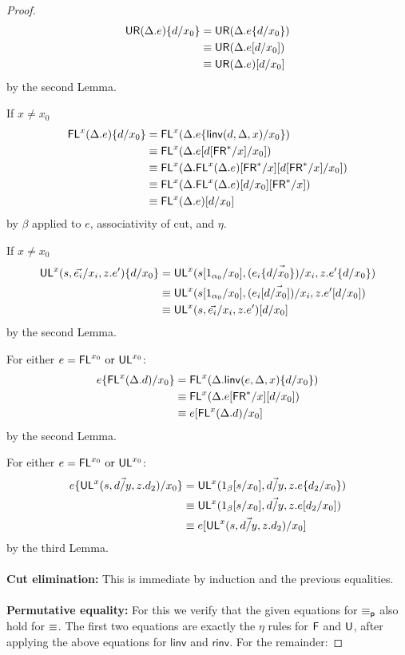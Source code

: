 \begin{proof}
\begin{align*}
\mathsf{UR}(\Delta.e)\{d/x_0\} 
&= \mathsf{UR}(\Delta.e\{d/x_0\})\\
&\equiv \mathsf{UR}(\Delta.e[d/x_0])\\
&\equiv \mathsf{UR}(\Delta.e)[d/x_0] 
\end{align*}
by the second Lemma.

If $x \neq x_0$
\begin{align*}
\mathsf{FL}^{x}(\Delta.e)\{d/x_0\} 
&= \mathsf{FL}^{x}(\Delta.e\{\mathsf{linv}(d,\Delta,x)/x_0\}) \\
&\equiv \mathsf{FL}^{x}(\Delta.e[d[\mathsf{FR}^*/x]/x_0]) \\
&\equiv \mathsf{FL}^{x}(\Delta.\mathsf{FL}^{x}(\Delta.e)[\mathsf{FR}^*/x][d[\mathsf{FR}^*/x]/x_0]) \\
&\equiv \mathsf{FL}^{x}(\Delta.\mathsf{FL}^{x}(\Delta.e)[d/x_0][\mathsf{FR}^*/x]) \\
&\equiv \mathsf{FL}^{x}(\Delta.e)[d/x_0] 
\end{align*}
by $\beta$ applied to $e$, associativity of cut, and $\eta$.

If $x \neq x_0$
\begin{align*}
\mathsf{UL}^{x}_{}(s,\vec{e_i}/x_i,z.e')\{d/x_0\} 
&= {\mathsf{UL}^{x}_{}(s[1_{\alpha_0}/x_0],\vec{(e_i\{d/x_0\})/x_i},z.e'\{d/x_0\})} \\
&\equiv {\ensuremath{\mathsf{UL}^{x}_{}(s[1_{\alpha_0}/x_0],\vec{(e_i[d/x_0])/x_i},z.e'[d/x_0])}} \\
&\equiv \mathsf{UL}^{x}_{}(s,\vec{e_i}/x_i,z.e')[d/x_0] 
\end{align*}
by the second Lemma.

For either $e = \mathsf{FL}^{x_0} \text{ or } \mathsf{UL}^{x_0}$:
\begin{align*}
e\{\mathsf{FL}^{x}(\Delta.d)/x_0\} 
&= \mathsf{FL}^{x}(\Delta.\mathsf{linv}(e,\Delta,x)\{d/x_0\}) \\
&\equiv \mathsf{FL}^{x}(\Delta.e[\mathsf{FR}^*/x][d/x_0]) \\
&\equiv e[\mathsf{FL}^{x}(\Delta.d)/x_0] 
\end{align*}
by the second Lemma.

For either $e = \mathsf{FL}^{x_0} \text{ or } \mathsf{UL}^{x_0}$:
\begin{align*}
e\{\mathsf{UL}^{x}_{}(s,\vec{d/y},z.d_2)/x_0\} 
&= \mathsf{UL}^{x}_{}(1_\beta[s/x_0],\vec{d/y},z.e\{d_2/x_0\}) \\
&\equiv \mathsf{UL}^{x}_{}(1_\beta[s/x_0],\vec{d/y},z.e[d_2/x_0]) \\
&\equiv e[\mathsf{UL}^{x}_{}(s,\vec{d/y},z.d_2)/x_0] 
\end{align*}
by the third Lemma.
\\~\\
\textbf{Cut elimination:} This is immediate by induction and the previous equalities.
\\~\\
\textbf{Permutative equality:} 
For this we verify that the given equations for $\equiv_{\mathsf{p}}$ also hold for $\equiv$. The first two equations are exactly the $\eta$ rules for $\mathsf{F}$ and $\mathsf{U}$, after applying the above equations for $\mathsf{linv}$ and $\mathsf{rinv}$. For the remainder:


\end{proof}
